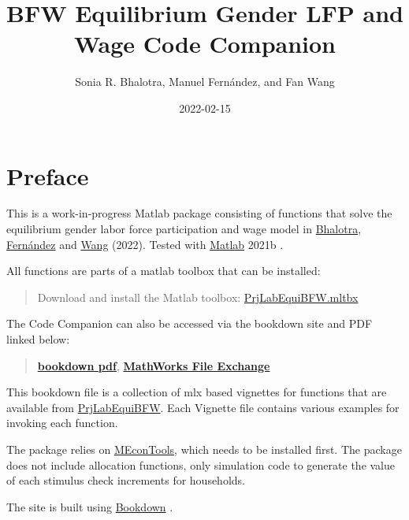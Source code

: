 \documentclass[
]{book}
\title{BFW Equilibrium Gender LFP and Wage Code Companion}
\author{Sonia R. Bhalotra, Manuel Fernández, and Fan Wang}
\date{2022-02-15}
\begin{document}
\maketitle

{
\hypersetup{linkcolor=}
\setcounter{tocdepth}{1}
\tableofcontents
}
\hypertarget{preface}{%
\chapter*{Preface}\label{preface}}

This is a work-in-progress Matlab package consisting of functions that solve the equilibrium gender labor force participation and wage model in \href{https://www.iza.org/person/2905/sonia-r-bhalotra}{Bhalotra}, \href{https://sites.google.com/view/manuelfernandezsierra}{Fernández} and \href{https://fanwangecon.github.io/}{Wang} (2022). Tested with \href{https://www.mathworks.com/products/matlab.html}{Matlab} 2021b \citep{matlab}.

All functions are parts of a matlab toolbox that can be installed:

\begin{quote}
Download and install the Matlab toolbox: \href{https://github.com/FanWangEcon/PrjLabEquiBFW/blob/main/PrjLabEquiBFW.mltbx}{PrjLabEquiBFW.mltbx}
\end{quote}

The Code Companion can also be accessed via the bookdown site and PDF linked below:

\begin{quote}
\href{https://fanwangecon.github.io/PrjLabEquiBFW/bookdown/BFW-Equilibrium-Gender-LFP-and-Wage-Code-Companion.pdf}{\textbf{bookdown pdf}}, \href{https://www.mathworks.com/matlabcentral/fileexchange/80164-PrjLabEquiBFW}{\textbf{MathWorks File Exchange}}
\end{quote}

This bookdown file is a collection of mlx based vignettes for functions that are available from \href{https://github.com/FanWangEcon/PrjLabEquiBFW}{PrjLabEquiBFW}. Each Vignette file contains various examples for invoking each function.

The package relies on \href{https://fanwangecon.github.io/MEconTools/}{MEconTools}, which needs to be installed first. The package does not include allocation functions, only simulation code to generate the value of each stimulus check increments for households.

The site is built using \href{https://bookdown.org/}{Bookdown} \citep{R-bookdown}.
\end{document}
